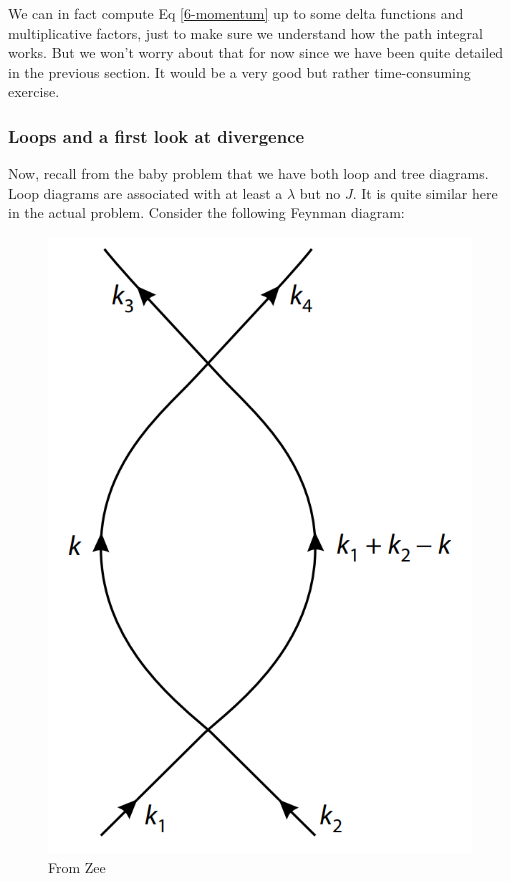 \documentclass{book}
\theoremstyle{definition}
\begin{document}
We can in fact compute Eq \eqref{6-momentum} up to some delta functions and multiplicative factors, just to make sure we understand how the path integral works. But we won't worry about that for now since we have been quite detailed in the previous section. It would be a very good but rather time-consuming exercise.




\subsubsection{Loops and a first look at divergence}

Now, recall from the baby problem that we have both loop and tree diagrams. Loop diagrams are associated with at least a $\lambda$ but no $J$. It is quite similar here in the actual problem. Consider the following Feynman diagram:
\begin{figure}[!htb]
	\centering
	\includegraphics[scale=0.3]{loop-feynman}
	\caption{From Zee}
\end{figure}
\end{document}
